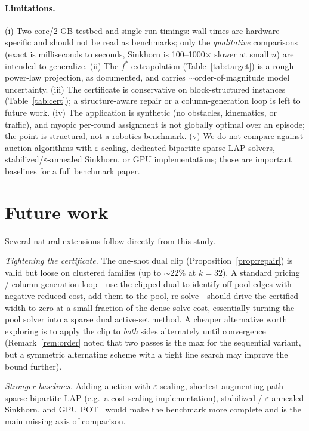 \documentclass[11pt]{article}
\theoremstyle{remark}
\begin{document}
\paragraph{Limitations.}
(i) Two-core/2-GB testbed and single-run timings: wall times are
hardware-specific and should not be read as benchmarks; only the
\emph{qualitative} comparisons (exact is milliseconds to seconds,
Sinkhorn is 100--1000$\times$ slower at small $n$) are intended to
generalize. (ii) The $f^*$ extrapolation (Table~\ref{tab:target}) is a
rough power-law projection, as documented, and carries $\sim$order-of-magnitude
model uncertainty. (iii) The certificate is conservative on block-structured
instances (Table~\ref{tab:cert}); a structure-aware repair or a
column-generation loop is left to future work. (iv) The application is
synthetic (no obstacles, kinematics, or traffic), and myopic per-round
assignment is not globally optimal over an episode; the point is
structural, not a robotics benchmark. (v) We do not compare against
auction algorithms with $\varepsilon$-scaling, dedicated bipartite sparse
LAP solvers, stabilized/$\varepsilon$-annealed Sinkhorn, or GPU
implementations; those are important baselines for a full benchmark paper.

\section{Future work}
\label{sec:future}

Several natural extensions follow directly from this study.

\emph{Tightening the certificate.} The one-shot dual clip
(Proposition~\ref{prop:repair}) is valid but loose on clustered families
(up to $\sim 22\%$ at $k=32$). A standard pricing / column-generation
loop---use the clipped dual to identify off-pool edges with negative
reduced cost, add them to the pool, re-solve---should drive the certified
width to zero at a small fraction of the dense-solve cost, essentially
turning the pool solver into a sparse dual active-set method. A cheaper
alternative worth exploring is to apply the clip to \emph{both} sides
alternately until convergence (Remark~\ref{rem:order} noted that two
passes is the max for the sequential variant, but a symmetric alternating
scheme with a tight line search may improve the bound further).

\emph{Stronger baselines.} Adding auction with $\varepsilon$-scaling,
shortest-augmenting-path sparse bipartite LAP (e.g.\ a cost-scaling
implementation), stabilized / $\varepsilon$-annealed Sinkhorn, and GPU
POT~\cite{flamary2021pot} would make the benchmark more complete and is
the main missing axis of comparison.
\end{document}
